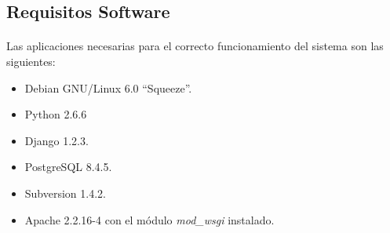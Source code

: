 \subsection{Requisitos Software}

  \paragraph{}Las aplicaciones necesarias para el correcto funcionamiento del
  sistema son las siguientes:

  \begin{itemize}
   \item Debian GNU/Linux 6.0 ``Squeeze''.
   \item Python 2.6.6
   \item Django 1.2.3.
   \item PostgreSQL 8.4.5.
   \item Subversion 1.4.2.
   \item Apache 2.2.16-4 con el módulo \textit{mod\_wsgi} instalado.
  \end{itemize}
